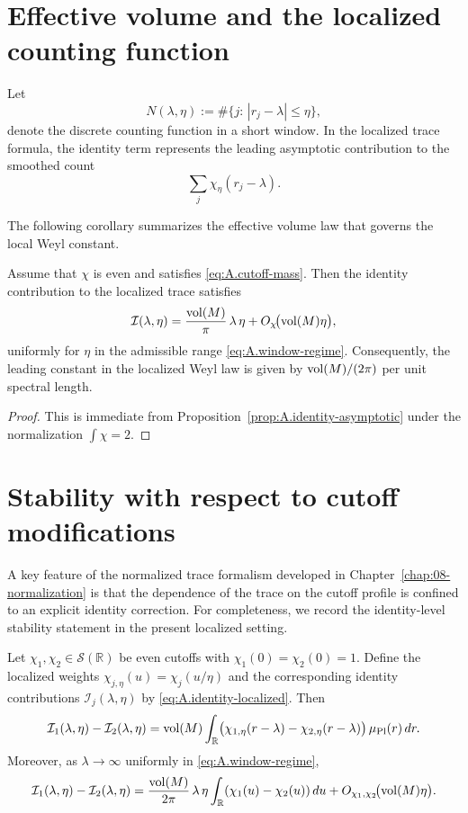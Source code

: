 \section{Effective volume and the localized counting function}
\label{sec:A.local-weyl}

Let
\[
N(\lambda,\eta)
:=
\#\{j:\,|r_j-\lambda|\le \eta\},
\]
denote the discrete counting function in a short window.  In the localized trace formula, the identity term
represents the leading asymptotic contribution to the smoothed count
\[
\sum_j \chi_\eta(r_j-\lambda).
\]

The following corollary summarizes the effective volume law that governs the local Weyl constant.

\begin{corollary}
\label{cor:A.effective-volume-constant}
Assume that $\chi$ is even and satisfies \eqref{eq:A.cutoff-mass}.  Then the identity contribution to the localized
trace satisfies
\[
\mathcal{I}(\lambda,\eta)
=
\frac{\mathop{\mathrm{vol}}\nolimits(M)}{\pi}\,\lambda\,\eta
+
O_{\chi}\!\bigl(\mathop{\mathrm{vol}}\nolimits(M)\eta\bigr),
\]
uniformly for $\eta$ in the admissible range \eqref{eq:A.window-regime}.
Consequently, the leading constant in the localized Weyl law is given by $\mathop{\mathrm{vol}}\nolimits(M)/(2\pi)$ per unit spectral length.
\end{corollary}

\begin{proof}
This is immediate from Proposition~\ref{prop:A.identity-asymptotic} under the normalization
$\int \chi = 2$.
\end{proof}

\section{Stability with respect to cutoff modifications}
\label{sec:A.cutoff-stability}

A key feature of the normalized trace formalism developed in Chapter~\ref{chap:08-normalization} is that the
dependence of the trace on the cutoff profile is confined to an explicit identity correction.
For completeness, we record the identity-level stability statement in the present localized setting.

\begin{proposition}
\label{prop:A.cutoff-correction}
Let $\chi_1,\chi_2\in\mathcal{S}(\mathbb{R})$ be even cutoffs with $\chi_1(0)=\chi_2(0)=1$.  Define the localized
weights $\chi_{j,\eta}(u)=\chi_j(u/\eta)$ and the corresponding identity contributions
$\mathcal{I}_j(\lambda,\eta)$ by \eqref{eq:A.identity-localized}.  Then
\begin{equation}
\label{eq:A.cutoff-correction}
\mathcal{I}_1(\lambda,\eta)-\mathcal{I}_2(\lambda,\eta)
=
\mathop{\mathrm{vol}}\nolimits(M)\int_{\mathbb{R}}
\bigl(\chi_{1,\eta}(r-\lambda)-\chi_{2,\eta}(r-\lambda)\bigr)\,\mu_{\mathrm{Pl}}(r)\,dr.
\end{equation}
Moreover, as $\lambda\to\infty$ uniformly in \eqref{eq:A.window-regime},
\[
\mathcal{I}_1(\lambda,\eta)-\mathcal{I}_2(\lambda,\eta)
=
\frac{\mathop{\mathrm{vol}}\nolimits(M)}{2\pi}\,\lambda\,\eta
\int_{\mathbb{R}}(\chi_1(u)-\chi_2(u))\,du
+
O_{\chi_1,\chi_2}\!\bigl(\mathop{\mathrm{vol}}\nolimits(M)\eta\bigr).
\]
\end{proposition}

